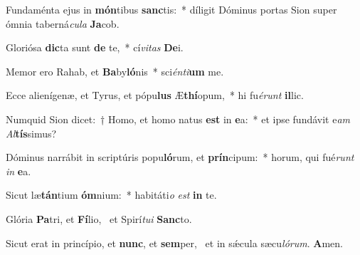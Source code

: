 \item Fundaménta ejus in \textbf{món}tibus \textbf{sanc}tis:~* díligit Dóminus portas Sion super ómnia taberná\textit{cu}\textit{la} \textbf{Ja}cob.
\item Gloriósa \textbf{dic}ta sunt \textbf{de} te,~* cí\textit{vi}\textit{tas} \textbf{De}i.
\item Memor ero Rahab, et \textbf{Ba}by\textbf{ló}nis~* sci\textit{én}\textit{ti}\textbf{um} me.
\item Ecce alienígenæ, et Tyrus, et pópu\textbf{lus} Æ\textbf{thí}opum,~* hi fu\textit{é}\textit{runt} \textbf{il}lic.
\item Numquid Sion dicet:~† Homo, et homo natus \textbf{est} in \textbf{e}a:~* et ipse fundávit e\textit{am} \textit{Al}\textbf{tís}simus?
\item Dóminus narrábit in scriptúris popu\textbf{ló}rum, et \textbf{prín}cipum:~* horum, qui fué\textit{runt} \textit{in} \textbf{e}a.
\item Sicut læ\textbf{tán}tium \textbf{óm}nium:~* habitáti\textit{o} \textit{est} \textbf{in} te.
\item Glória \textbf{Pa}tri, et \textbf{Fí}lio,~\psstar{} et Spirí\textit{tu}\textit{i} \textbf{Sanc}to.
\item Sicut erat in princípio, et \textbf{nunc}, et \textbf{sem}per,~\psstar{} et in sǽcula sæcu\textit{ló}\textit{rum}. \textbf{A}men.